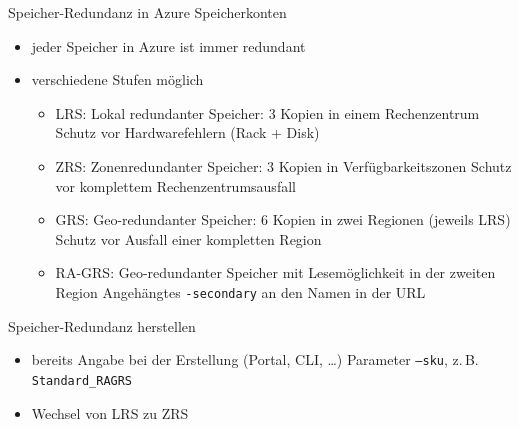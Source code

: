 \begin{flashcard}[Definition]{Speicher-Redundanz in Azure Speicherkonten}
    \begin{itemize}
        \item jeder Speicher in Azure ist immer redundant
        \item verschiedene Stufen möglich
        \begin{itemize}
            \item LRS: Lokal redundanter Speicher: 3 Kopien in einem Rechenzentrum\newline
                Schutz vor Hardwarefehlern (Rack + Disk)
            \item ZRS: Zonenredundanter Speicher: 3 Kopien in Verfügbarkeitszonen\newline
                Schutz vor komplettem Rechenzentrumsausfall
            \item GRS: Geo-redundanter Speicher: 6 Kopien in zwei Regionen (jeweils LRS)\newline
                Schutz vor Ausfall einer kompletten Region
            \item RA-GRS: Geo-redundanter Speicher mit Lesemöglichkeit in der zweiten Region\newline
            Angehängtes \texttt{-secondary} an den Namen in der URL
        \end{itemize}
    \end{itemize}
\end{flashcard}

\begin{flashcard}[Definition]{Speicher-Redundanz herstellen}
    \begin{itemize}
        \item bereits Angabe bei der Erstellung (Portal, CLI, \ldots)\newline
            Parameter \texttt{--sku}, z.\,B. \texttt{Standard\_RAGRS}
        \item Wechsel von LRS zu ZRS
    \end{itemize}
\end{flashcard}


